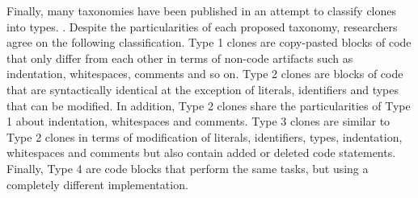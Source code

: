 Finally, many taxonomies have been published in an attempt to classify clones into types. \cite{Mayrand1996,Balazinska1999,Koschke2006,Bellon2007,Kontogiannis,Kapser}.
Despite the particularities of each proposed taxonomy, researchers agree on the following classification.
Type 1 clones are copy-pasted blocks of code that only differ from each other in terms of non-code artifacts such as indentation, whitespaces, comments and so on.
Type 2 clones are blocks of code that are syntactically identical at the exception of literals, identifiers and types that can be modified.
In addition, Type 2 clones share the particularities of Type 1 about indentation, whitespaces and comments.
Type 3 clones are similar to Type 2 clones in terms of modification of literals, identifiers, types, indentation, whitespaces and comments but also contain added or deleted code statements.
Finally, Type 4 are code blocks that perform the same tasks, but using a completely different implementation.
